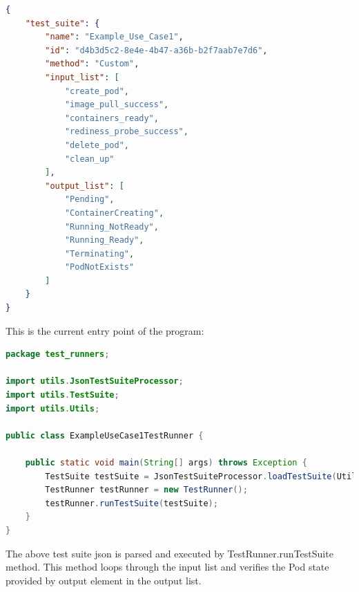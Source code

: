 \documentclass[main.tex]{subfiles}
\begin{document}
\begin{lstlisting}[language=json]
{
    "test_suite": {
        "name": "Example_Use_Case1",
        "id": "d4b3d5c2-8e4e-4b47-a36b-b2f7aab7e7d6",
        "method": "Custom",
        "input_list": [
            "create_pod",
            "image_pull_success",
            "containers_ready",
            "rediness_probe_success",
            "delete_pod",
            "clean_up"
        ],
        "output_list": [
            "Pending",
            "ContainerCreating",
            "Running_NotReady",
            "Running_Ready",
            "Terminating",
            "PodNotExists"
        ]
    }
}\end{lstlisting}
\vspace{10pt}

This is the current entry point of the program:
\begin{lstlisting}[language=Java]
package test_runners;

import utils.JsonTestSuiteProcessor;
import utils.TestSuite;
import utils.Utils;

public class ExampleUseCase1TestRunner {

    public static void main(String[] args) throws Exception {
        TestSuite testSuite = JsonTestSuiteProcessor.loadTestSuite(Utils.getResourceFilePath("test_suites/Example_Use_Case1-test_suite.json")).testSuite;
        TestRunner testRunner = new TestRunner();
        testRunner.runTestSuite(testSuite);
    }
}
\end{lstlisting}

The above test suite json is parsed and executed by TestRunner.runTestSuite method. This method loops through the input list and verifies the Pod state provided by output element in the output list.
\end{document}
